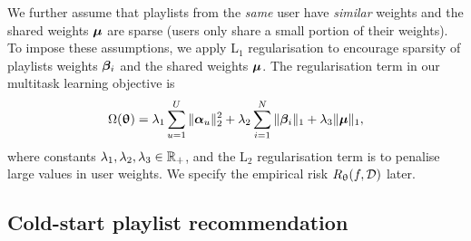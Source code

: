 We further assume that playlists from the \emph{same} user have \emph{similar} weights %
and the shared weights $\bm{\mu}$ are sparse %
(\ie users only share a small portion of their weights).
To impose these assumptions, we apply L$_1$ regularisation to encourage sparsity %
of playlists weights ${\bm{\beta}}_i$ %
and the shared weights $\bm{\mu}$.
%
The regularisation term in our multitask learning objective is
\begin{equation}
\label{eq:reg}
\Omega({\bm{\uptheta}}) 
= \lambda_1 \sum_{u=1}^U \|{\bm{\alpha}}_u\|_2^2 
  + \lambda_2 \sum_{i=1}^N \|{\bm{\beta}}_i\|_1 
  + \lambda_3 \| \bm{\mu} \|_1,
\end{equation}
where constants $\lambda_1, \lambda_2, \lambda_3 \in \mathbb{R}_+$,
and the L$_2$ regularisation term is to penalise large values in user weights. %
We specify the empirical risk $R_{\uptheta}(f, \mathcal{D})$ later.


\subsection{Cold-start playlist recommendation}

